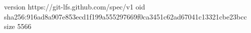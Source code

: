 version https://git-lfs.github.com/spec/v1
oid sha256:916ad8a907e853ecd1f199a555297669f0ca3451c62ad67041c13321cbe23bcc
size 5566
